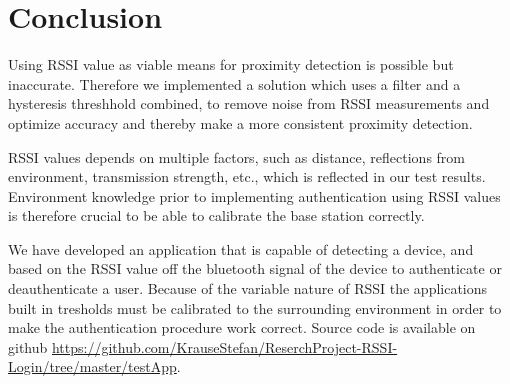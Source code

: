 \section{Conclusion}
Using RSSI value as viable means for proximity detection is possible but inaccurate. Therefore we implemented a solution which uses a filter and a hysteresis threshhold combined, to remove noise from RSSI measurements and optimize accuracy and thereby make a more consistent proximity detection.

RSSI values depends on multiple factors, such as distance, reflections from environment, transmission strength, etc., which is reflected in our test results. Environment knowledge prior to implementing authentication using RSSI values is therefore crucial to be able to calibrate the base station correctly.

We have developed an application that is capable of detecting a device, and based on the RSSI value off the bluetooth signal of the device to authenticate or deauthenticate a user. Because of the variable nature of RSSI the applications built in tresholds must be calibrated to the surrounding environment in order to make the authentication procedure work correct. Source code is available on github \url{https://github.com/KrauseStefan/ReserchProject-RSSI-Login/tree/master/testApp}.

%

